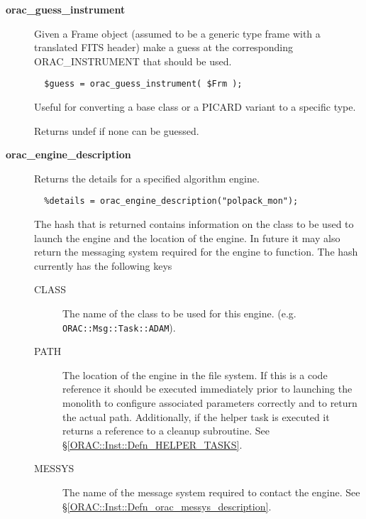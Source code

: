 \begin{description}
\item[{\textbf{orac\_guess\_instrument}}] \mbox{}

Given a Frame object (assumed to be a generic type frame with
a translated FITS header) make a guess at the corresponding
ORAC\_INSTRUMENT that should be used.

\begin{verbatim}
  $guess = orac_guess_instrument( $Frm );
\end{verbatim}


Useful for converting a base class or a PICARD variant to
a specific type.



Returns undef if none can be guessed.


\item[{\textbf{orac\_engine\_description}}] \mbox{}

Returns the details for a specified algorithm engine.

\begin{verbatim}
  %details = orac_engine_description("polpack_mon");
\end{verbatim}


The hash that is returned contains information on the
class to be used to launch the engine and the location
of the engine. In future it may also return the messaging
system required for the engine to function. The hash currently
has the following keys

\begin{description}

\item[{CLASS}] \mbox{}

The name of the class to be used for this engine.
(e.g. \texttt{ORAC::Msg::Task::ADAM}).


\item[{PATH}] \mbox{}

The location of the engine in the file system. If this
is a code reference it should be executed immediately
prior to launching the monolith to configure associated
parameters correctly and to return the actual path.
Additionally, if the helper task is executed it returns
a reference to a cleanup subroutine. See \S\ref{ORAC::Inst::Defn_HELPER_TASKS}.


\item[{MESSYS}] \mbox{}

The name of the message system required to contact the engine.
See \S\ref{ORAC::Inst::Defn_orac_messys_description}.

\end{description}



\end{description}
